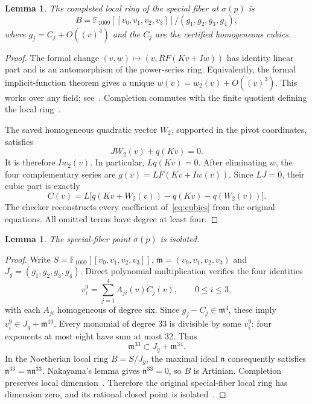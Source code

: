 \documentclass[11pt]{amsart}
\newtheorem{lemma}[theorem]{Lemma}
\theoremstyle{remark}
\newcommand{\kk}{\mathbb F_{1009}}
\newcommand{\m}{\mathfrak m}
\begin{document}
\begin{lemma}\label{lem:formal}
The completed local ring of the special fiber at $\sigma(p)$ is
\[
 B=\kk[[v_0,v_1,v_2,v_3]]/(g_1,g_2,g_3,g_4),
\]
where $g_j=C_j+O((v)^4)$ and the $C_j$ are the certified homogeneous cubics.
\end{lemma}
\begin{proof}
The formal change $(v,w)\mapsto(v,RF(Kv+Iw))$ has identity linear part and is an automorphism of the power-series ring. Equivalently, the formal implicit-function theorem gives a unique $w(v)=w_2(v)+O((v)^3)$. This works over any field; see~\cite[Tag 07NM]{Stacks}. Completion commutes with the finite quotient defining the local ring~\cite[Tag 00MA]{Stacks}.

The saved homogeneous quadratic vector $W_2$, supported in the pivot coordinates, satisfies
\begin{equation}\label{eq:correction}
 JW_2(v)+q(Kv)=0.
\end{equation}
It is therefore $Iw_2(v)$. In particular, $Lq(Kv)=0$. After eliminating $w$, the four complementary series are $g(v)=LF(Kv+Iw(v))$. Since $LJ=0$, their cubic part is exactly
\begin{equation}\label{eq:cubics}
 C(v)=L\bigl[q(Kv+W_2(v))-q(Kv)-q(W_2(v))\bigr].
\end{equation}
The checker reconstructs every coefficient of~\eqref{eq:cubics} from the original equations. All omitted terms have degree at least four.
\end{proof}

\begin{lemma}\label{lem:isolated}
The special-fiber point $\sigma(p)$ is isolated.
\end{lemma}
\begin{proof}
Write $S=\kk[[v_0,v_1,v_2,v_3]]$, $\m=(v_0,v_1,v_2,v_3)$ and $J_g=(g_1,g_2,g_3,g_4)$. Direct polynomial multiplication verifies the four identities
\begin{equation}\label{eq:powers}
 v_i^9=\sum_{j=1}^4 A_{ji}(v)C_j(v),\qquad 0\le i\le3,
\end{equation}
with each $A_{ji}$ homogeneous of degree six. Since $g_j-C_j\in\m^4$, these imply $v_i^9\in J_g+\m^{10}$. Every monomial of degree 33 is divisible by some $v_i^9$: four exponents at most eight have sum at most 32. Thus
\[
 \m^{33}\subset J_g+\m^{34}.
\]
In the Noetherian local ring $B=S/J_g$, the maximal ideal $\mathfrak n$ consequently satisfies $\mathfrak n^{33}=\mathfrak n\mathfrak n^{33}$. Nakayama's lemma gives $\mathfrak n^{33}=0$, so $B$ is Artinian. Completion preserves local dimension~\cite[Tags 00DV and 07NV]{Stacks}. Therefore the original special-fiber local ring has dimension zero, and its rational closed point is isolated~\cite[Tag 01TH]{Stacks}.
\end{proof}
\end{document}
